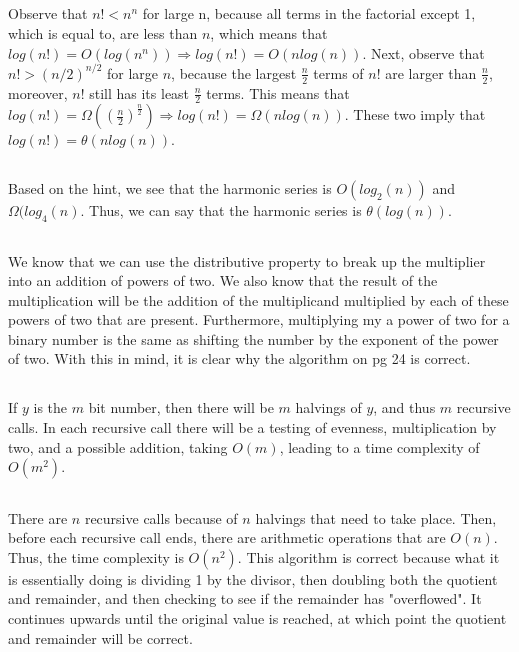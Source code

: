 \documentclass{article}
\begin{document}
\subsection{} Observe that $n!<n^n$ for large n, because all terms in the factorial except 1, which is equal to, are less than $n$, which means that $log(n!)=O(log(n^n)) \Rightarrow log(n!)=O(nlog(n))$. Next, observe that $n! > (n/2)^{n/2}$ for large $n$, because the largest $\frac{n}{2}$ terms of $n!$ are larger than $\frac{n}{2}$, moreover, $n!$ still has its least $\frac{n}{2}$ terms. This means that $log(n!)=\Omega((\frac{n}{2})^{\frac{n}{2}}) \Rightarrow log(n!)=\Omega(nlog(n))$. These two imply that $log(n!)=\theta(nlog(n))$. 
\subsection{}Based on the hint, we see that the harmonic series is $O(log_2(n))$ and $\Omega(log_4(n)$. Thus, we can say that the harmonic series is $\theta(log(n))$.
\subsection{}We know that we can use the distributive property to break up the multiplier into an addition of powers of two. We also know that the result of the multiplication will be the addition of the multiplicand multiplied by each of these powers of two that are present. Furthermore, multiplying my a power of two for a binary number is the same as shifting the number by the exponent of the power of two. With this in mind, it is clear why the algorithm on pg 24 is correct. 
\subsection{}If $y$ is the $m$ bit number, then there will be $m$ halvings of $y$, and thus $m$ recursive calls. In each recursive call there will be a testing of evenness, multiplication by two, and a possible addition, taking $O(m)$, leading to a time complexity of $O(m^2)$.
\subsection{}There are $n$ recursive calls because of $n$ halvings that need to take place. Then, before each recursive call ends, there are arithmetic operations that are $O(n)$. Thus, the time complexity is $O(n^2)$. This algorithm is correct because what it is essentially doing is dividing 1 by the divisor, then doubling both the quotient and remainder, and then checking to see if the remainder has "overflowed". It continues upwards until the original value is reached, at which point the quotient and remainder will be correct. 
\end{document}
